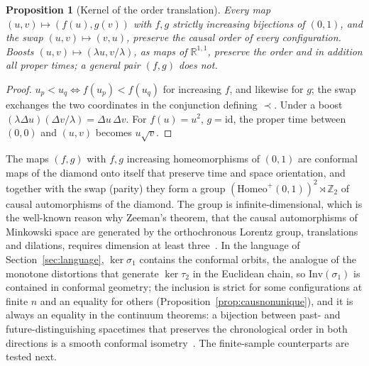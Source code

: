 \documentclass[11pt,a4paper]{article}
\theoremstyle{plain}
\newtheorem{proposition}[theorem]{Proposition}
\theoremstyle{definition}
\theoremstyle{remark}
\newcommand{\R}{\mathbb{R}}
\newcommand{\Inv}{\mathrm{Inv}}
\begin{document}
\begin{proposition}[Kernel of the order translation]\label{prop:causkernel}
Every map $(u,v)\mapsto(f(u),g(v))$ with $f,g$ strictly increasing bijections of $(0,1)$, and the swap $(u,v)\mapsto(v,u)$, preserve the causal order of every configuration. Boosts $(u,v)\mapsto(\lambda u,v/\lambda)$, as maps of $\R^{1,1}$, preserve the order and in addition all proper times; a general pair $(f,g)$ does not.
\end{proposition}
\begin{proof}
$u_p<u_q\iff f(u_p)<f(u_q)$ for increasing $f$, and likewise for $g$; the swap exchanges the two coordinates in the conjunction defining $\prec$. Under a boost $(\lambda\Delta u)(\Delta v/\lambda)=\Delta u\,\Delta v$. For $f(u)=u^2$, $g=\mathrm{id}$, the proper time between $(0,0)$ and $(u,v)$ becomes $u\sqrt v$.
\end{proof}
The maps $(f,g)$ with $f,g$ increasing homeomorphisms of $(0,1)$ are conformal maps of the diamond onto itself that preserve time and space orientation, and together with the swap (parity) they form a group $(\mathrm{Homeo}^+(0,1))^2\rtimes\mathbb Z_2$ of causal automorphisms of the diamond. The group is infinite-dimensional, which is the well-known reason why Zeeman's theorem, that the causal automorphisms of Minkowski space are generated by the orthochronous Lorentz group, translations and dilations, requires dimension at least three~\citep{zeeman1964}. In the language of Section~\ref{sec:language}, $\ker\sigma_1$ contains the conformal orbits, the analogue of the monotone distortions that generate $\ker\tau_2$ in the Euclidean chain, so $\Inv(\sigma_1)$ is contained in conformal geometry; the inclusion is strict for some configurations at finite $n$ and an equality for others (Proposition~\ref{prop:causnonunique}), and it is always an equality in the continuum theorems: a bijection between past- and future-distinguishing spacetimes that preserves the chronological order in both directions is a smooth conformal isometry~\citep{hawking1976,malament1977}. The finite-sample counterparts are tested next.
\end{document}
